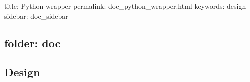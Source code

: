 

 title\+: Python wrapper permalink\+: doc\+\_\+python\+\_\+wrapper.\+html keywords\+: design sidebar\+: doc\+\_\+sidebar \subsection*{folder\+: doc }

\subsection*{Design}